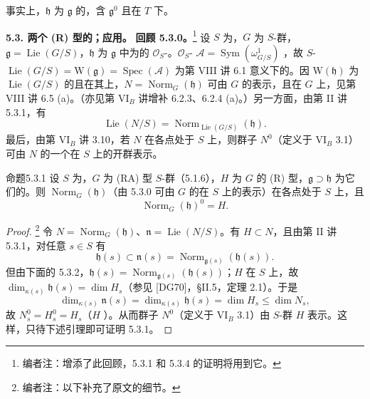 事实上，$\mathfrak h$ 为 $\mathfrak g$ 的，含 $\mathfrak g^0$ 且在 $T$ 下。

\textbf{5.3. 两个 (R) 型的；应用。}
\textbf{回顾 5.3.0。}\footnote{编者注：增添了此回顾，5.3.1 和 5.3.4 的证明将用到它。} 设 $S$ 为，$G$ 为 $S$-群，$\mathfrak g=\operatorname{Lie}(G/S)$，$\mathfrak h$ 为 $\mathfrak g$ 中为的 $\mathcal O_S$-。$\mathcal O_S$- $\mathcal A=\operatorname{Sym}(\omega^1_{G/S})$ ，故 $S$- $\operatorname{Lie}(G/S)=\mathrm W(\mathfrak g)=\operatorname{Spec}(\mathcal A)$ 为第 VIII 讲 6.1 意义下的。因 $\mathrm W(\mathfrak h)$ 为 $\operatorname{Lie}(G/S)$ 的且在其上，$N=\operatorname{Norm}_G(\mathfrak h)$ 可由 $G$ 的表示，且在 $G$ 上，见第 VIII 讲 6.5 (a)。（亦见第 VI$_B$ 讲增补 6.2.3、6.2.4 (a)。）另一方面，由第 II 讲 5.3.1，有
\[\operatorname{Lie}(N/S)=\operatorname{Norm}_{\operatorname{Lie}(G/S)}(\mathfrak h).\]
最后，由第 VI$_B$ 讲 3.10，若 $N$ 在各点处于 $S$ 上，则群子 $N^0$（定义于 VI$_B$ 3.1）可由 $N$ 的一个在 $S$ 上的开群表示。
\begin{SGAresult}{命题}{5.3.1} 设 $S$ 为，$G$ 为 (RA) 型 $S$-群（5.1.6），$H$ 为 $G$ 的 (R) 型，$\mathfrak g\supset\mathfrak h$ 为它们的。则 $\operatorname{Norm}_G(\mathfrak h)$（由 5.3.0 可由 $G$ 的在 $S$ 上的表示）在各点处于 $S$ 上，且
\[\operatorname{Norm}_G(\mathfrak h)^0=H.\]
\end{SGAresult}
\begin{proof}\footnote{编者注：以下补充了原文的细节。} 令 $N=\operatorname{Norm}_G(\mathfrak h)$、$\mathfrak n=\operatorname{Lie}(N/S)$。有 $H\subset N$，且由第 II 讲 5.3.1，对任意 $s\in S$ 有
\[\mathfrak h(s)\subset\mathfrak n(s)=\operatorname{Norm}_{\mathfrak g(s)}(\mathfrak h(s)).\]
但由下面的 5.3.2，$\mathfrak h(s)=\operatorname{Norm}_{\mathfrak g(s)}(\mathfrak h(s))$；$H$ 在 $S$ 上，故 $\dim_{\kappa(s)}\mathfrak h(s)=\dim H_s$（参见 [DG70]，§II.5，定理 2.1）。于是
\[\dim_{\kappa(s)}\mathfrak n(s)=\dim_{\kappa(s)}\mathfrak h(s)=\dim H_s\leq\dim N_s,\]
故 $N_s^0=H_s^0=H_s$（$H$ ）。从而群子 $N^0$（定义于 VI$_B$ 3.1）由 $S$-群 $H$ 表示。这样，只待下述引理即可证明 5.3.1。\end{proof}
